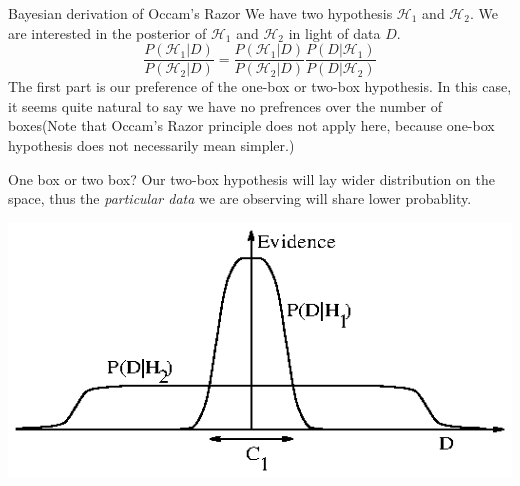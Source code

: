 \documentclass{beamer}
\def\H{\mathcal{H}}
\begin{document}
\begin{frame}{Bayesian derivation of Occam's Razor}
We have two hypothesis $\H_1$ and $\H_2$. We are interested in the posterior of $\H_1$ and $\H_2$ in light of data $D$. 
$$\frac{P(\H_1 | D)}{P(\H_2 | D)} = \frac{P(\H_1 | D)}{P(\H_2 | D)}\frac{P(D|\H_1)}{P(D|\H_2)}$$
The first part is our preference of the one-box or two-box hypothesis. In this case, it seems quite natural to say we have no prefrences over the number of boxes(Note that Occam's Razor principle does not apply here, because one-box hypothesis does not necessarily mean simpler.)
\end{frame}
\begin{frame}{One box or two box?}
Our two-box hypothesis will lay wider distribution on the space, thus the \textit{particular data} we are observing will share lower probablity.
\begin{center}
\includegraphics[scale=1]{./figure197.eps}
\end{center}
\end{frame}
\end{document}
